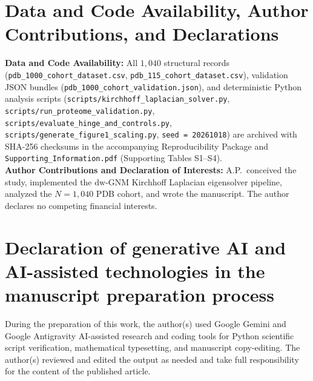 \documentclass[11pt,onecolumn,letterpaper]{article}
\begin{document}
\section*{Data and Code Availability, Author Contributions, and Declarations}
\noindent\textbf{Data and Code Availability:} All $1,040$ structural records (\texttt{pdb\_1000\_cohort\_dataset.csv}, \texttt{pdb\_115\_cohort\_dataset.csv}), validation JSON bundles (\texttt{pdb\_1000\_cohort\_validation.json}), and deterministic Python analysis scripts (\texttt{scripts/kirchhoff\_laplacian\_solver.py}, \texttt{scripts/run\_proteome\_validation.py}, \texttt{scripts/evaluate\_hinge\_and\_controls.py}, \texttt{scripts/generate\_figure1\_scaling.py}, \texttt{seed = 20261018}) are archived with SHA-256 checksums in the accompanying Reproducibility Package and \texttt{Supporting\_Information.pdf} (Supporting Tables S1--S4).\\
\textbf{Author Contributions and Declaration of Interests:} A.P.\ conceived the study, implemented the $\mathrm{dw\text{-}GNM}$ Kirchhoff Laplacian eigensolver pipeline, analyzed the $N = 1,040$ PDB cohort, and wrote the manuscript. The author declares no competing financial interests.

\section*{Declaration of generative AI and AI-assisted technologies in the manuscript preparation process}
\noindent During the preparation of this work, the author(s) used Google Gemini and Google Antigravity AI-assisted research and coding tools for Python scientific script verification, mathematical typesetting, and manuscript copy-editing. The author(s) reviewed and edited the output as needed and take full responsibility for the content of the published article.
\end{document}
